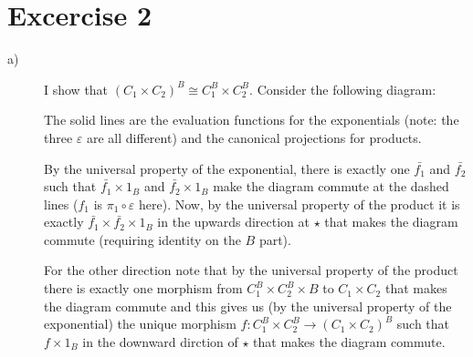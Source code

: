 \documentclass{scrartcl}
\begin{document}
    \section*{Excercise 2}
    
    \begin{description}
        \item[a)] I show that $(C_1 × C_2)^B \cong C_1^B × C_2^B$. Consider the following diagram:
    \begin{figure}[H]
        \centering
    \end{figure}
        The solid lines are the evaluation functions for the exponentials (note: the three $ε$ are all different) and the canonical projections for products.
        
        By the universal property of the exponential, there is exactly one $\bar{f_1}$ and $\bar{f_2}$ such that $\bar{f_1} × 1_B$ and $\bar{f_2} × 1_B$ make the diagram commute at the dashed lines ($f_1$ is $π_1 \circ ε$ here). Now, by the universal property of the product it is exactly $\bar{f_1} × \bar{f_2} × 1_B$ in the upwards direction at $\star$ that makes the diagram commute (requiring identity on the $B$ part).
        
        For the other direction note that by the universal property of the product there is exactly one morphism from $C_1^B × C_2^B × B$ to $C_1 × C_2$ that makes the diagram commute and this gives us (by the universal property of the exponential) the unique morphism $f : C_1^B × C_2^B → (C_1 × C_2)^B$ such that $f × 1_B$ in the downward dirction of $\star$ that makes the diagram commute.
        

\end{description}
\end{document}
